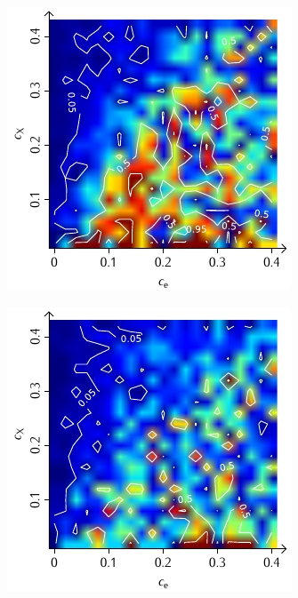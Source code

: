 \documentclass[a4paper, 10pt, twoside, openany]{book} %
\begin{document}
\begin{figure}
\begin{minipage}[t]{0.48\textwidth}
			\includegraphics[width=\textwidth]{Abbildungen/Phasendiagramme/Konturen/F_penalty_cluster_P.pdf}
			\label{F_penalty_cluster_P}
		\end{minipage}
		\begin{minipage}[t]{0.48\textwidth}
			\includegraphics[width=\textwidth]{Abbildungen/Phasendiagramme/Konturen/F_random_P.pdf}

\end{minipage}
\end{figure}
\end{document}
